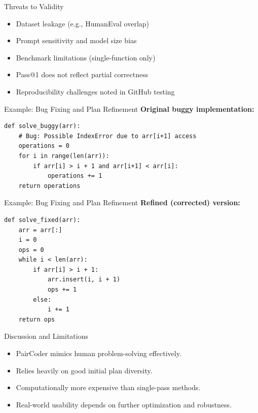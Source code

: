 \documentclass{beamer}
\begin{document}
\begin{frame}{Threats to Validity}
\begin{itemize}
    \item Dataset leakage (e.g., HumanEval overlap)
    \item Prompt sensitivity and model size bias
    \item Benchmark limitations (single-function only)
    \item Pass@1 does not reflect partial correctness
    \item Reproducibility challenges noted in GitHub testing
\end{itemize}
\end{frame}


\begin{frame}[fragile]{Example: Bug Fixing and Plan Refinement}
\textbf{Original buggy implementation:}
\begin{verbatim}
def solve_buggy(arr):
    # Bug: Possible IndexError due to arr[i+1] access
    operations = 0
    for i in range(len(arr)):
        if arr[i] > i + 1 and arr[i+1] < arr[i]:
            operations += 1
    return operations
\end{verbatim}
\end{frame}

\begin{frame}[fragile]{Example: Bug Fixing and Plan Refinement}
\textbf{Refined (corrected) version:}
\begin{verbatim}
def solve_fixed(arr):
    arr = arr[:]
    i = 0
    ops = 0
    while i < len(arr):
        if arr[i] > i + 1:
            arr.insert(i, i + 1)
            ops += 1
        else:
            i += 1
    return ops
\end{verbatim}
\end{frame}



\begin{frame}{Discussion and Limitations}
\begin{itemize}
    \item PairCoder mimics human problem-solving effectively.
    \item Relies heavily on good initial plan diversity.
    \item Computationally more expensive than single-pass methods.
    \item Real-world usability depends on further optimization and robustness.
\end{itemize}
\end{frame}
\end{document}
